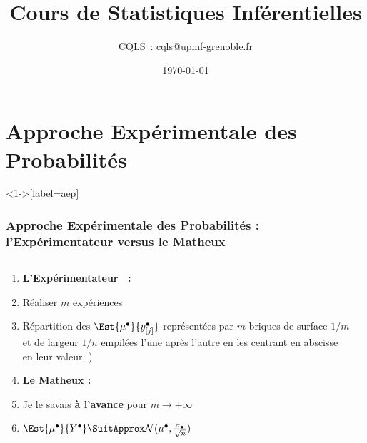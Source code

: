 \documentclass[11pt]{beamer}
\title[Problématiques Produits A et B]
{Cours de Statistiques Inférentielles}
\author{CQLS~: cqls@upmf-grenoble.fr}
\date{\today}
\begin{document}
\maketitle



\section[A.E.P.]{Approche Expérimentale des Probabilités}

\begin{frame}<1->[label=aep]
\frametitle<1->{\textbf{A}pproche \textbf{E}xpérimentale des \textbf{P}robabilités : l'Expérimentateur versus le Matheux}
\begin{columns}
\begin{column}{5cm}
      \begin{enumerate}
     \item[] \textbf{L'Expérimentateur ~:} 
        \item<1-10| alert@1-4>
         Réaliser $m$ expériences
        \item<5-10| alert@5-8>
          Répartition des $\Est{\mu^\bullet}{y^\bullet_{[j]}}$ {\small représentées par $m$ briques de surface $1/m$ et de largeur $1/n$ empilées l'une après l'autre en les centrant en abscisse en leur valeur.}
          )
  \item<9-10>[] \textbf{Le Matheux :}      
  \item<9-10| alert@9>
          Je le savais \textbf{à l'avance} pour $m\to+\infty$
           \item<10| alert@10>
           $\Est{\mu^\bullet}{Y^\bullet}\SuitApprox \mathcal{N}(\mu^\bullet,\frac{\sigma_\bullet}{\sqrt{n}})$
      \end{enumerate}
     
\end{column}    
\begin{column}{6.5cm}








\end{column}
\end{columns}
\end{frame}
\end{document}
